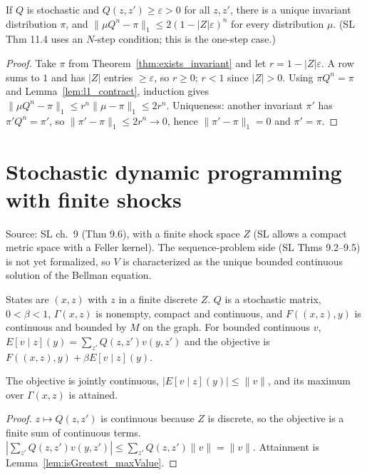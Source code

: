 \begin{theorem}
\label{thm:doeblin}
\leanok
{}
If $Q$ is stochastic and $Q(z, z') \ge \varepsilon > 0$ for all $z, z'$, there is a unique invariant distribution $\pi$,
and $\|\mu Q^n - \pi\|_1 \le 2(1 - |Z|\varepsilon)^n$ for every distribution $\mu$. (SL Thm 11.4 uses an $N$-step
condition; this is the one-step case.)
\end{theorem}
\begin{proof}
\leanok
Take $\pi$ from Theorem~\ref{thm:exists_invariant} and let $r = 1 - |Z|\varepsilon$. A row sums to $1$ and has $|Z|$
entries $\ge \varepsilon$, so $r \ge 0$; $r < 1$ since $|Z| > 0$. Using $\pi Q^n = \pi$ and
Lemma~\ref{lem:l1_contract}, induction gives $\|\mu Q^n - \pi\|_1 \le r^n \|\mu - \pi\|_1 \le 2 r^n$. Uniqueness: another
invariant $\pi'$ has $\pi' Q^n = \pi'$, so $\|\pi' - \pi\|_1 \le 2 r^n \to 0$, hence $\|\pi' - \pi\|_1 = 0$ and $\pi' = \pi$.
\end{proof}

\section{Stochastic dynamic programming with finite shocks}
\label{sec:stoch_dp}

Source: SL ch.~9 (Thm 9.6), with a finite shock space $Z$ (SL allows a compact metric space with a Feller kernel). The
sequence-problem side (SL Thms 9.2--9.5) is not yet formalized, so $V$ is characterized as the unique bounded continuous
solution of the Bellman equation.

\begin{definition}
\label{def:stoch_dp}
\leanok
{}
States are $(x, z)$ with $z$ in a finite discrete $Z$. $Q$ is a stochastic matrix, $0 < \beta < 1$, $\Gamma(x, z)$ is
nonempty, compact and continuous, and $F((x, z), y)$ is continuous and bounded by $M$ on the graph. For bounded continuous
$v$, $E[v \mid z](y) = \sum_{z'} Q(z, z') v(y, z')$ and the objective is $F((x, z), y) + \beta E[v \mid z](y)$.
\end{definition}

\begin{lemma}
\label{lem:stoch_objective}
\leanok
{}
The objective is jointly continuous, $|E[v \mid z](y)| \le \|v\|$, and its maximum over $\Gamma(x, z)$ is attained.
\end{lemma}
\begin{proof}
\leanok
$z \mapsto Q(z, z')$ is continuous because $Z$ is discrete, so the objective is a finite sum of continuous terms.
$|\sum_{z'} Q(z, z') v(y, z')| \le \sum_{z'} Q(z, z') \|v\| = \|v\|$. Attainment is Lemma~\ref{lem:isGreatest_maxValue}.
\end{proof}

